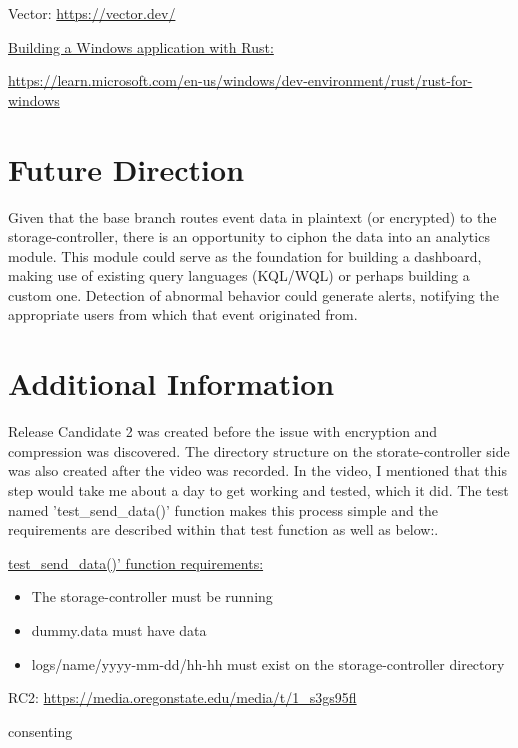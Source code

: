 \documentclass{article}
\begin{document}
Vector: \url{https://vector.dev/}\vspace{0.25cm}

\underline{Building a Windows application with Rust:}\vspace{0.25cm}

\url{https://learn.microsoft.com/en-us/windows/dev-environment/rust/rust-for-windows}

\newpage

\section{Future Direction}

Given that the base branch routes event data in plaintext (or encrypted) to the storage-controller, there is an opportunity to ciphon the data into an analytics module. This module could serve as the foundation for building a dashboard, making use of existing query languages (KQL/WQL) or perhaps building a custom one. Detection of abnormal behavior could generate alerts, notifying the appropriate users from which that event originated from.


\section{Additional Information}

Release Candidate 2 was created before the issue with encryption and compression was discovered. The directory structure on the storate-controller side was also created after the video was recorded. In the video, I mentioned that this step would take me about a day to get working and tested, which it did. The test named 'test\_send\_data()' function makes this process simple and the requirements are described within that test function as well as below:.\vspace{0.25cm}

\underline{test\_send\_data()' function requirements:}
\begin{itemize}
    \item{The storage-controller must be running}
    \item{dummy.data must have data}
    \item{logs/name/yyyy-mm-dd/hh-hh must exist on the storage-controller directory}
\end{itemize}


RC2: \url{https://media.oregonstate.edu/media/t/1\_s3gs95fl}

consenting
\end{document}
